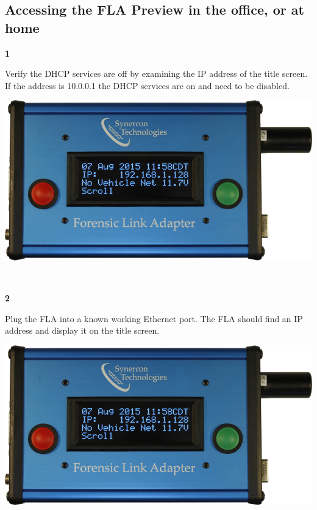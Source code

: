 \documentclass[11pt]{article}
\begin{document}
\subsection{Accessing the FLA Preview in the office, or at home}
\noindent\begin{minipage}{0.3\textwidth}%
\begin{center}
\textbf{1}\\[\baselineskip]
\end{center}
Verify the DHCP services are off by examining the IP address of the title screen. If the address is 10.0.0.1 the DHCP services are on and need to be disabled.
\end{minipage}%
\hfill%
\begin{minipage}{0.6\textwidth}
\includegraphics[width=\linewidth]{../../media/fla_screens/ethernet_and_others/main/title_no_net}
\end{minipage}\\[\baselineskip]
\noindent\begin{minipage}{0.3\textwidth}%
\begin{center}
\textbf{2}\\[\baselineskip]
\end{center}
Plug the FLA into a known working Ethernet port. The FLA should find an IP address and display it on the title screen.
\end{minipage}%
\hfill%
\begin{minipage}{0.6\textwidth}
\includegraphics[width=\linewidth]{../../media/fla_screens/ethernet_and_others/main/title_no_net}
\end{minipage}\\[\baselineskip]
\end{document}
